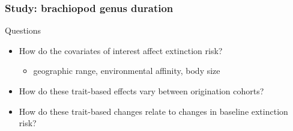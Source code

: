 \documentclass{beamer}
\begin{document}
\begin{frame}
  \frametitle{Study: brachiopod genus duration}

  \begin{alertblock}{Questions}
    \begin{itemize}
      \item How do the covariates of interest affect extinction risk?
        \begin{itemize}
          \item geographic range, environmental affinity, body size 
        \end{itemize}
      \item How do these trait-based effects vary between origination cohorts?
      \item How do these trait-based changes relate to changes in baseline extinction risk?
    \end{itemize}
  \end{alertblock}
\end{frame}
\end{document}
